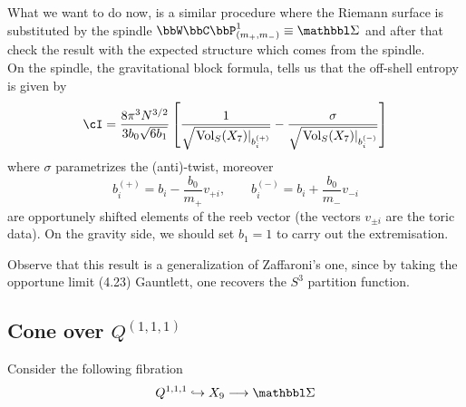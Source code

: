 What we want to do now, is a similar procedure where the Riemann surface is substituted by the spindle $\bbW\bbC\bbP^{1}_{(m_{+},m_{-})}\equiv\Spindle$ and after that check the result with the expected structure which comes from the spindle.\\
On the spindle, the gravitational block formula, tells us that the off-shell entropy is given by
\begin{equation}
	\cI=\frac{8\pi^{3} N^{3/2}}{3b_{0}\sqrt{6b_{1}}}\left[\frac{1}{\sqrt{\left.\text{Vol}_{S}(X_{7})\right|_{b_{i}^{(+)}}}}-\frac{\sigma}{\sqrt{\left.\text{Vol}_{S}(X_{7})\right|_{b_{i}^{(-)}}}}\right]
\end{equation}
where $\sigma$ parametrizes the (anti)-twist, moreover
\begin{equation}
	b_{i}^{(+)}=b_{i}-\frac{b_{0}}{m_{+}}v_{+i},\qquad b_{i}^{(-)}=b_{i}+\frac{b_{0}}{m_{-}}v_{-i}
\end{equation}
are opportunely shifted elements of the reeb vector (the vectors $v_{\pm i}$ are the toric data). On the gravity side, we should set $b_{1}=1$ to carry out the extremisation.

Observe that this result is a generalization of Zaffaroni's one, since by taking the opportune limit (4.23) Gauntlett, one recovers the $S^{3}$ partition function.

\subsection{\texorpdfstring{Cone over $Q^{(1,1,1)}$}{Q111}}
Consider the following fibration
\begin{equation}
	Q^{1,1,1}\hookrightarrow X_{9}\longrightarrow\Spindle
\end{equation}

